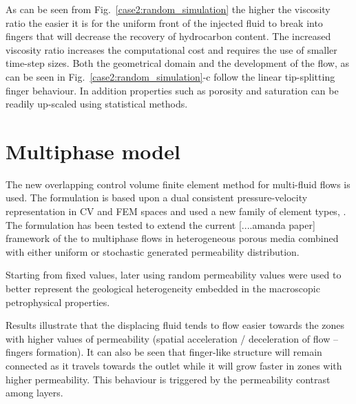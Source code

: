 \documentclass[12pt,a4paper,oneside]{report}%
\begin{document}
As can be seen from Fig.~\ref{case2:random_simulation} the higher the viscosity ratio the easier it is for the uniform front of the injected fluid to break into fingers that will decrease the recovery of hydrocarbon content. The increased viscosity ratio increases the computational cost and requires the use of smaller time-step sizes. Both the geometrical domain and the development of the flow, as can be seen in Fig.~\ref{case2:random_simulation}-c follow the linear tip-splitting finger behaviour. In addition properties such as porosity and saturation can be readily up-scaled using statistical methods.%

\section{Multiphase model}

The new overlapping control volume finite element method for multi-fluid flows is used. The formulation is based upon a dual consistent pressure-velocity representation in CV and FEM spaces and used a new family of element types, . The formulation has been tested to extend the current [....amanda paper] framework of the \citep[embedded in the Fluidity software framework][]{Fluidity15} to multiphase flows in heterogeneous porous media combined with either uniform or stochastic generated permeability distribution. 

Starting from fixed values, later using random permeability values were used to better represent the geological heterogeneity embedded in the macroscopic petrophysical properties. 

Results illustrate that the displacing fluid tends to flow easier towards the zones with higher values of permeability (spatial acceleration / deceleration of flow – fingers formation). It can also be seen that finger-like structure will remain connected as it travels towards the outlet while it will grow faster in zones with higher permeability. This behaviour is triggered by the permeability contrast among layers.
\end{document}
